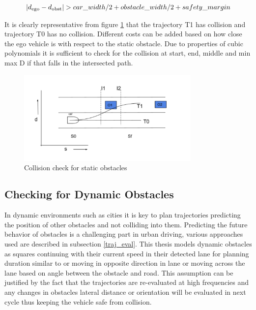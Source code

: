 \begin{equation}
    |d\textsubscript{ego} - d\textsubscript{obst}| > car\_width/2 + obstacle\_width/2 + safety\_margin
    \label{static_obst_safety_dist}
\end{equation}

It is clearly representative from figure \ref{static_check} that the trajectory T1 has collision and trajectory T0 has no collision. Different costs can be added based on how close the ego vehicle is with respect to the static obstacle. Due to properties of cubic polynomials it is sufficient to check for the collision at start, end, middle and min max D if that falls in the intersected path. 


 \begin{figure}
    \centering
    \includegraphics[width=0.8\textwidth]{Images/static_check.png}
    \caption{Collision check for static obstacles}
    \label{static_check}
\end{figure}



\subsection{Checking for Dynamic Obstacles} \label{obstacle_check_dynamic}

In dynamic environments such as cities it is key to plan trajectories predicting the position of other obstacles and not colliding into them. Predicting the future behavior of obstacles
is a challenging part in urban driving, various approaches used are described in subsection \ref{traj_eval}. This thesis models dynamic obstacles as squares continuing with their current speed in their detected lane for planning duration similar to \cite{unit_A_star} or moving in opposite direction in lane or moving across the lane based on angle between the obstacle and road. This assumption can be justified by the fact that the trajectories are re-evaluated at high frequencies and any changes in obstacles lateral distance or orientation will be evaluated in next cycle thus keeping the vehicle safe from collision. 

